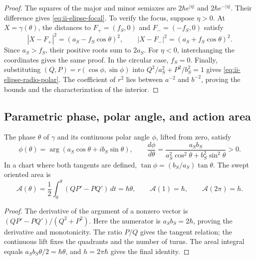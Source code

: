 \begin{proof}
The squares of the major and minor semiaxes are
\(2\hbar e^{|\eta|}\) and \(2\hbar e^{-|\eta|}\). Their difference
gives \eqref{eq:ii-elipse-focal}. To verify the focus, suppose
\(\eta>0\). At \(X=\gamma(\theta)\), the distances to
\(F_+=(f_S,0)\) and \(F_-=(-f_S,0)\) satisfy
\[
 |X-F_+|^2=(a_S-f_S\cos\theta)^2,\qquad
 |X-F_-|^2=(a_S+f_S\cos\theta)^2.
\]
Since \(a_S>f_S\), their positive roots sum to \(2a_S\).
For \(\eta<0\), interchanging the coordinates gives the same proof.
In the circular case, \(f_S=0\). Finally, substituting
\((Q,P)=r(\cos\phi,\sin\phi)\) into
\(Q^2/a_S^2+P^2/b_S^2=1\) gives
\eqref{eq:ii-elipse-radio-polar}. The coefficient of \(r^2\) lies
between \(a^{-2}\) and \(b^{-2}\), proving the bounds and the
characterization of the interior.
\end{proof}

\subsection{Parametric phase, polar angle, and action area}
\label{sec:ii-elipse-fase-area}

\begin{proposition}
\label{prop:ii-elipse-area}
The phase \(\theta\) of \(\gamma\) and its continuous polar angle
\(\phi\), lifted from zero, satisfy
\begin{equation}
 \phi(\theta)=\arg(a_S\cos\theta+i b_S\sin\theta),\qquad
 \frac{d\phi}{d\theta}
 =\frac{a_Sb_S}{a_S^2\cos^2\theta+b_S^2\sin^2\theta}>0.
 \label{eq:ii-elipse-fases}
\end{equation}
In a chart where both tangents are defined,
\(\tan\phi=(b_S/a_S)\tan\theta\). The swept oriented area is
\begin{equation}
 \mathcal A(\theta)=\frac12\int_0^\theta(QP'-PQ')\,dt
 =\hbar\theta,\qquad
 \mathcal A(1)=\hbar,\qquad \mathcal A(2\pi)=h.
 \label{eq:ii-elipse-area-fase}
\end{equation}
\end{proposition}

\begin{proof}
The derivative of the argument of a nonzero vector is
\((QP'-PQ')/(Q^2+P^2)\). Here the numerator is
\(a_Sb_S=2\hbar\), proving the derivative and monotonicity.
The ratio \(P/Q\) gives the tangent relation; the continuous
lift fixes the quadrants and the number of turns. The areal integral
equals \(a_Sb_S\theta/2=\hbar\theta\), and
\(h=2\pi\hbar\) gives the final identity.
\end{proof}

